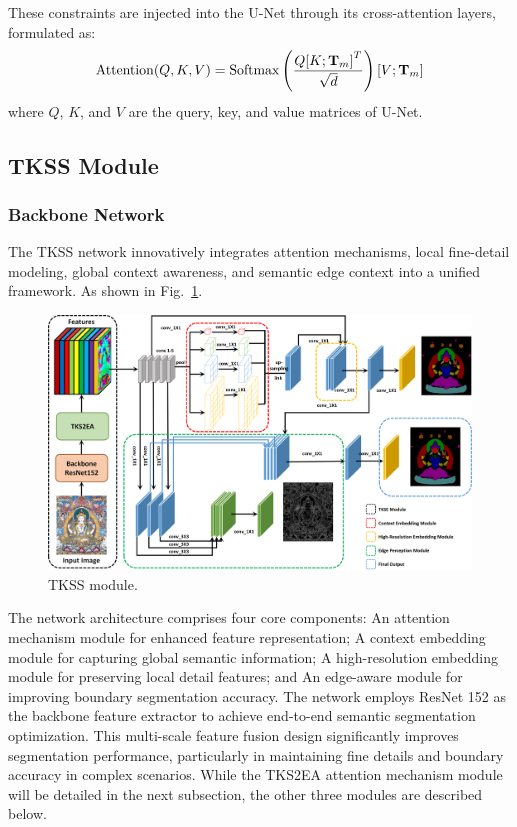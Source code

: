 \documentclass[sn-mathphys]{sn-jnl}%
\theoremstyle{thmstyleone}%
\theoremstyle{thmstyletwo}%
\theoremstyle{thmstylethree}%
\begin{document}
These constraints are injected into the U-Net through its cross-attention layers, formulated as:
\begin{equation}
	{\rm{Attention}}(Q,K,V) = {\rm{Softmax}}\left( {\frac{{Q{{[K;{{\bf{T}}_m}]}^T}}}{{\sqrt d }}} \right)[V;{{\bf{T}}_m}]
	\label{eq4}
\end{equation}
where $ Q $, $ K $, and $ V $ are the query, key, and value matrices of U-Net.
\subsection{TKSS Module}
\subsubsection{Backbone Network}
The TKSS network innovatively integrates attention mechanisms, local fine-detail modeling, global context awareness, and semantic edge context into a unified framework. As shown in Fig.~\ref{fig4}. 
\begin{figure}[htbp]
	\centerline{\includegraphics[width=1\linewidth]{fig4.png}}
	\caption{TKSS module.}
	\label{fig4}
\end{figure}
The network architecture comprises four core components: An attention mechanism module for enhanced feature representation; A context embedding module for capturing global semantic information; A high-resolution embedding module for preserving local detail features; and An edge-aware module for improving boundary segmentation accuracy. The network employs ResNet 152 as the backbone feature extractor to achieve end-to-end semantic segmentation optimization. This multi-scale feature fusion design significantly improves segmentation performance, particularly in maintaining fine details and boundary accuracy in complex scenarios. While the TKS2EA attention mechanism module will be detailed in the next subsection, the other three modules are described below.
\end{document}
